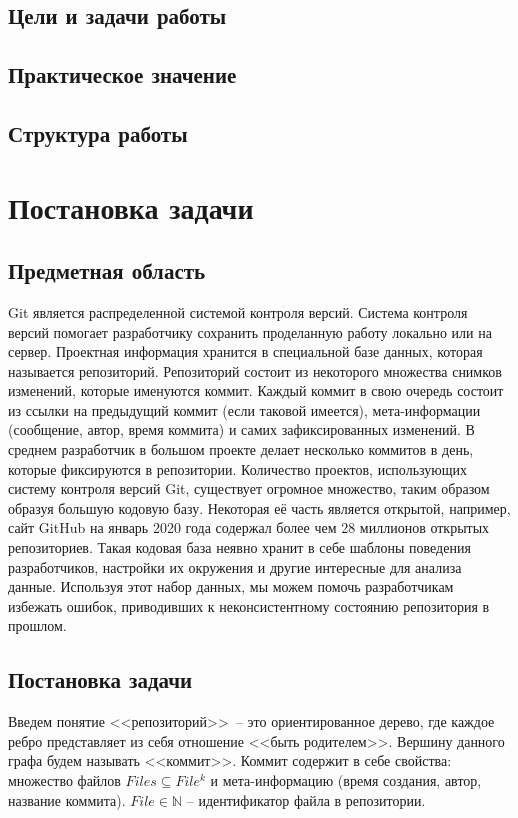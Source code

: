 \documentclass[times]{itmo-student-thesis}
\begin{document}
\section{Цели и задачи работы}
\section{Практическое значение}
\section{Структура работы}





\chapter{Постановка задачи}
\section{Предметная область}
Git является распределенной системой контроля версий. Система контроля версий помогает разработчику сохранить проделанную работу локально или на сервер. Проектная информация хранится в специальной базе данных, которая называется репозиторий. Репозиторий состоит из некоторого множества снимков изменений, которые именуются коммит. Каждый коммит в свою очередь состоит из ссылки на предыдущий коммит (если таковой имеется), мета-информации (сообщение, автор, время коммита) и самих зафиксированных изменений. В среднем разработчик в большом проекте делает несколько коммитов в день, которые фиксируются в репозитории. Количество проектов, использующих систему контроля версий Git, существует огромное множество, таким образом образуя большую кодовую базу. Некоторая её часть является открытой, например, сайт GitHub на январь 2020 года содержал более чем 28 миллионов открытых репозиториев. Такая кодовая база неявно хранит в себе шаблоны поведения разработчиков, настройки их окружения и другие интересные для анализа данные. Используя этот набор данных, мы можем помочь разработчикам избежать ошибок, приводивших к неконсистентному состоянию репозитория в прошлом.
\section{Постановка задачи}
Введем понятие <<репозиторий>>~-- это ориентированное дерево, где каждое ребро представляет из себя отношение <<быть родителем>>. Вершину данного графа будем называть <<коммит>>. Коммит содержит в себе свойства: множество файлов $Files \subseteq File^k$ и мета-информацию (время создания, автор, название коммита). $File \in \mathbb{N}$ -- идентификатор файла в репозитории.\\
\end{document}
